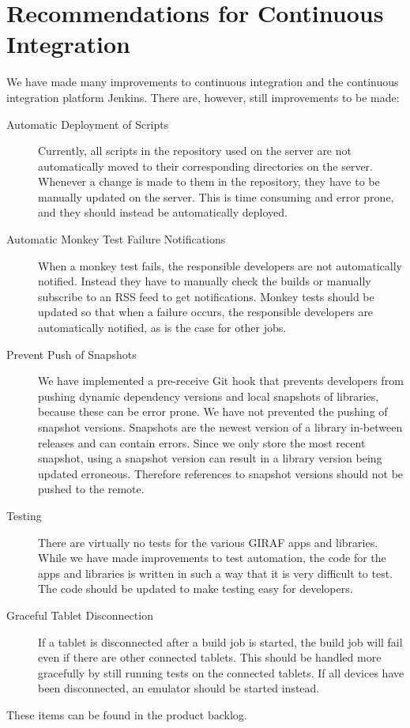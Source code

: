 \section{Recommendations for Continuous Integration}\label{sec:ci_recommendations}
We have made many improvements to continuous integration and the continuous integration platform Jenkins. There are, however, still improvements to be made:

\begin{description}
  \item[Automatic Deployment of Scripts] Currently, all scripts in the  repository used on the server are not automatically moved to their corresponding directories on the server. Whenever a change is made to them in the repository, they have to be manually updated on the server. This is time consuming and error prone, and they should instead be automatically deployed.
  \item[Automatic Monkey Test Failure Notifications] When a monkey test fails, the responsible developers are not automatically notified. Instead they have to manually check the builds or manually subscribe to an RSS feed to get notifications. Monkey tests should be updated so that when a failure occurs, the responsible developers are automatically notified, as is the case for other jobs.
  \item[Prevent Push of Snapshots] We have implemented a pre-receive Git hook that prevents developers from pushing dynamic dependency versions and local snapshots of libraries, because these can be error prone. We have not prevented the pushing of snapshot versions. Snapshots are the newest version of a library in-between releases and can contain errors. Since we only store the most recent snapshot, using a snapshot version can result in a library version being updated erroneous. Therefore references to snapshot versions should not be pushed to the remote.
  \item[Testing] There are virtually no tests for the various GIRAF apps and libraries. While we have made improvements to test automation, the code for the apps and libraries is written in such a way that it is very difficult to test. The code should be updated to make testing easy for developers.
  \item[Graceful Tablet Disconnection] If a tablet is disconnected after a build job is started, the build job will fail even if there are other connected tablets. This should be handled more gracefully by still running tests on the connected tablets. If all devices have been disconnected, an emulator should be started instead.
\end{description}

These items can be found in the product backlog.